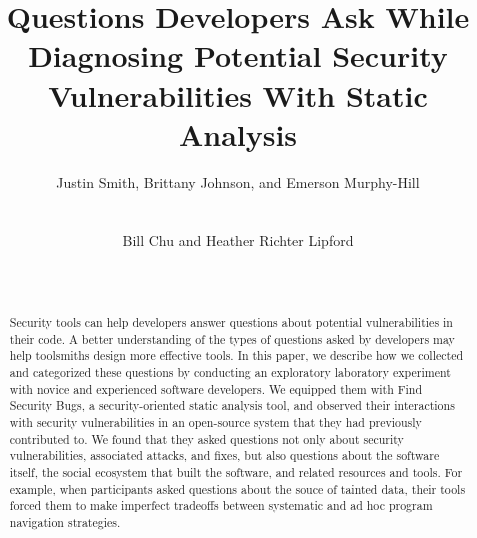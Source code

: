 \documentclass{acm_proc_article-sp}
\newcommand{\blind}[1]{#1}
\begin{document}
\title{Questions Developers Ask While Diagnosing Potential Security Vulnerabilities With Static Analysis}

\author{
\alignauthor Justin Smith, Brittany Johnson, and Emerson Murphy-Hill\\
\\
 \\
\alignauthor Bill Chu and Heather Richter Lipford\\
\\
\\
}

\maketitle


\begin{abstract}

Security tools can help developers answer questions about potential vulnerabilities in their code. 
A better understanding of the types of questions asked by developers may help toolsmiths design more effective tools.
In this paper, we describe how we collected and categorized these questions 
by conducting an exploratory laboratory experiment with novice and experienced software developers.
We equipped them with Find Security Bugs, a security-oriented static analysis tool, and observed their interactions with security vulnerabilities in an open-source system that they had previously contributed to.
We found that they asked questions not only about security vulnerabilities, associated attacks, and fixes,
but also questions about the software itself, the social ecosystem that built the software,
and related resources and tools.
For example, when participants asked questions about the souce of tainted data,
their tools forced them to make imperfect tradeoffs between 
systematic and ad hoc program navigation strategies.
\end{abstract}
\end{document}
